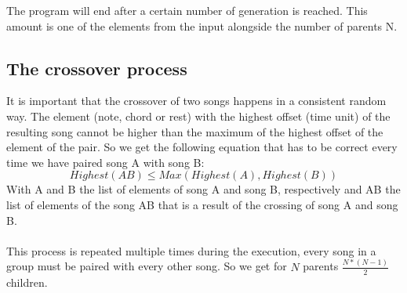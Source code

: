 \documentclass[a4paper]{article}
\begin{document}
The program will end after a certain number of generation is reached. This amount is one of the elements from the input alongside the number of parents N.



\subsection{The crossover process} \label{sec:crossover}
It is important that the crossover of two songs happens in a consistent random way. The element (note, chord or rest) with the highest offset (time unit) of the resulting song cannot be higher than the maximum of the highest offset of the element of the pair. So we get the following equation that has to be correct every time we have paired song A with song B:
\[ Highest(AB) \leq Max(Highest(A),Highest(B))\]
With A and B the list of elements of song A and song B, respectively and AB the list of elements of the song AB that is a result of the crossing of song A and song B.
\\\\
This process is repeated multiple times during the execution, every song in a group must be paired with every other song. So we get for \(N\) parents \( \frac{N * (N-1)}{2} \) children.
\end{document}
